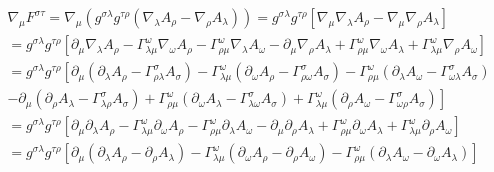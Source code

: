 \documentclass[12pt]{article}
\def\nn{\nonumber}
\begin{document}
\begin{gather}
\nabla_{\mu}
F^{\sigma \tau}
=
\nabla_{\mu} (g^{\sigma \lambda} g^{\tau \rho} (\nabla_{\lambda}A_{\rho} - \nabla_{\rho}A_{\lambda}))
=
g^{\sigma \lambda} g^{\tau \rho} 
\left[
\nabla_{\mu} \nabla_{\lambda}A_{\rho} 
- 
\nabla_{\mu} \nabla_{\rho}A_{\lambda}
\right]
\nn \\
=
g^{\sigma \lambda} g^{\tau \rho} 
\left[
\partial_{\mu} \nabla_{\lambda}A_{\rho} 
-
\Gamma_{\lambda \mu}^{\omega} \nabla_{\omega}A_{\rho} 
-
\Gamma_{\rho \mu}^{\omega} \nabla_{\lambda}A_{ \omega} 
- 
\partial_{\mu} \nabla_{\rho}A_{\lambda} 
+
\Gamma_{\rho \mu}^{\omega} \nabla_{\omega}A_{\lambda} 
+
\Gamma_{\lambda \mu}^{\omega} \nabla_{\rho}A_{ \omega} 
\right]
\nn \\
=
g^{\sigma \lambda} g^{\tau \rho} 
\left[
\partial_{\mu} 
(\partial_{\lambda}A_{\rho} - \Gamma_{\rho \lambda}^{\sigma} A_{\sigma})
-
\Gamma_{\lambda \mu}^{\omega}
(\partial_{\omega} A_{\rho} - \Gamma_{\rho \omega}^{\sigma} A_{\sigma})
-
\Gamma_{\rho \mu}^{\omega}
(\partial_{\lambda} A_{\omega} - \Gamma_{\omega \lambda}^{\sigma} A_{\sigma})
\right.
\nn \\
\left.
- 
\partial_{\mu}
(\partial_{\rho}A_{\lambda} - \Gamma_{\lambda \rho}^{\sigma} A_{\sigma})
+
\Gamma_{\rho \mu}^{\omega}
(\partial_{\omega} A_{\lambda} - \Gamma_{\lambda \omega}^{\sigma} A_{\sigma})
+
\Gamma_{\lambda \mu}^{\omega}
(\partial_{\rho} A_{\omega} - \Gamma_{\omega \rho}^{\sigma} A_{\sigma})
\right]
\nn \\
=
g^{\sigma \lambda} g^{\tau \rho} 
\left[
\partial_{\mu} \partial_{\lambda}A_{\rho}
-
\Gamma_{\lambda \mu}^{\omega} \partial_{\omega} A_{\rho}
-
\Gamma_{\rho \mu}^{\omega}\partial_{\lambda} A_{\omega}
- 
\partial_{\mu} \partial_{\rho}A_{\lambda}
+
\Gamma_{\rho \mu}^{\omega}
\partial_{\omega} A_{\lambda}
+
\Gamma_{\lambda \mu}^{\omega}
\partial_{\rho} A_{\omega} 
\right]
\nn \\
=
g^{\sigma \lambda} g^{\tau \rho} 
\left[
\partial_{\mu} 
(\partial_{\lambda}A_{\rho}
-
\partial_{\rho}A_{\lambda})
-
\Gamma_{\lambda \mu}^{\omega} 
(\partial_{\omega} A_{\rho}
-
\partial_{\rho} A_{\omega})
-
\Gamma_{\rho \mu}^{\omega}
(\partial_{\lambda} A_{\omega}
-
\partial_{\omega} A_{\lambda})
\right]
\end{gather}
\end{document}

